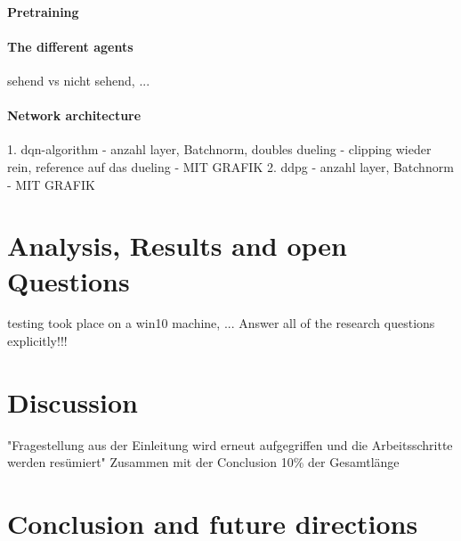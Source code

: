 \subsubsection{Pretraining}

\subsubsection{The different agents}

sehend vs nicht sehend, ...

\subsubsection{Network architecture}

1. dqn-algorithm
  - anzahl layer, Batchnorm, doubles dueling
  - clipping wieder rein, reference auf das dueling
  - MIT GRAFIK
2. ddpg
  - anzahl layer, Batchnorm
  - MIT GRAFIK

\chapter{Analysis, Results and open Questions}

testing took place on a win10 machine, ...
Answer all of the research questions explicitly!!!

\chapter{Discussion}

"Fragestellung aus der Einleitung wird erneut aufgegriffen und die Arbeitsschritte
werden resümiert"
Zusammen mit der Conclusion 10\% der Gesamtlänge

\chapter{Conclusion and future directions}





